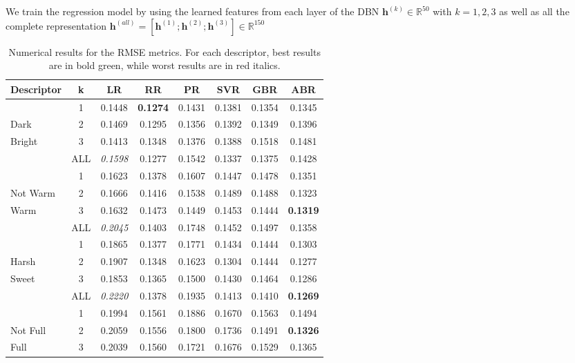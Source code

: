 We train the regression model by using the learned features from each layer of the DBN $\mathbf{h}^{(k)} \in \mathbb{R}^{50} $ with $k=1,2,3$ as well as all the complete representation  $\mathbf{h}^{(all)}=[\mathbf{h}^{(1)};\mathbf{h}^{(2)};\mathbf{h}^{(3)}] \in \mathbb{R}^{150}$

\begin{table}[!tbp] %
\caption{Numerical results for the RMSE metrics. For each descriptor, best results are in bold green, while worst results are in red italics.}
\label{tab:Violin:allRMSE}
\centering
\bgroup
\def\arraystretch{1.5}
\begin{tabular}{||l|c|c|c|c|c|c|c||}
\hline
\hline
Descriptor & k & LR & RR & PR & SVR & GBR & ABR\\
\hline
\hline
 & 1 & 0.1448 & \color[HTML]{326B00} \textbf{0.1274} & 0.1431 & 0.1381 & 0.1354 & 0.1345 \\
Dark & 2 & 0.1469 & 0.1295 & 0.1356 & 0.1392 & 0.1349 & 0.1396 \\
Bright & 3 & 0.1413 & 0.1348 & 0.1376 & 0.1388 & 0.1518 & 0.1481 \\
 & ALL & \color[HTML]{8E0000} \textit{0.1598} & 0.1277 & 0.1542 & 0.1337 & 0.1375 & 0.1428 \\
\hline
\hline
 & 1 & 0.1623 & 0.1378 & 0.1607 & 0.1447 & 0.1478 & 0.1351 \\
Not Warm & 2 & 0.1666 & 0.1416 & 0.1538 & 0.1489 & 0.1488 & 0.1323 \\
Warm & 3 & 0.1632 & 0.1473 & 0.1449 & 0.1453 & 0.1444 & \color[HTML]{326B00} \textbf{0.1319} \\
 & ALL & \color[HTML]{8E0000} \textit{0.2045} & 0.1403 & 0.1748 & 0.1452 & 0.1497 & 0.1358 \\
\hline
\hline
 & 1 & 0.1865 & 0.1377 & 0.1771 & 0.1434 & 0.1444 & 0.1303 \\
Harsh & 2 & 0.1907 & 0.1348 & 0.1623 & 0.1304 & 0.1444 & 0.1277 \\
Sweet & 3 & 0.1853 & 0.1365 & 0.1500 & 0.1430 & 0.1464 & 0.1286 \\
 & ALL & \color[HTML]{8E0000} \textit{0.2220} & 0.1378 & 0.1935 & 0.1413 & 0.1410 & \color[HTML]{326B00} \textbf{0.1269} \\
\hline
\hline
 & 1 & 0.1994 & 0.1561 & 0.1886 & 0.1670 & 0.1563 & 0.1494 \\
Not Full & 2 & 0.2059 & 0.1556 & 0.1800 & 0.1736 & 0.1491 & \color[HTML]{326B00} \textbf{0.1326} \\
Full & 3 & 0.2039 & 0.1560 & 0.1721 & 0.1676 & 0.1529 & 0.1365 \\

\end{tabular}
\end{table}
